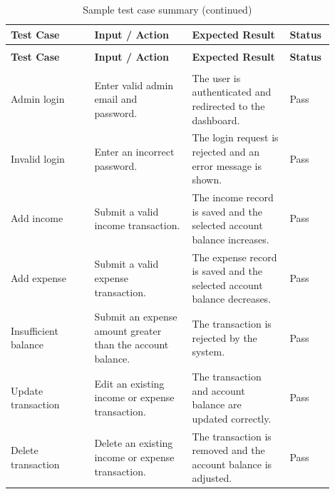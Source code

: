 \documentclass{article}
\begin{document}
\small
\renewcommand{\arraystretch}{1.2}

\begin{longtable}{
    >{\raggedright\arraybackslash}p{0.24\linewidth}
    J{0.28\linewidth}
    J{0.28\linewidth}
    >{\centering\arraybackslash}p{0.10\linewidth}
}
\caption{Sample test case summary}
\label{tab:test-cases} \\

\toprule
\textbf{Test Case} & \textbf{Input / Action} & \textbf{Expected Result} & \textbf{Status} \\
\midrule
\endfirsthead

\caption[]{Sample test case summary (continued)} \\

\toprule
\textbf{Test Case} & \textbf{Input / Action} & \textbf{Expected Result} & \textbf{Status} \\
\midrule
\endhead

\midrule
{} \\
\endfoot

\bottomrule
\endlastfoot

Admin login 
& Enter valid admin email and password. 
& The user is authenticated and redirected to the dashboard. 
& Pass \\

Invalid login 
& Enter an incorrect password. 
& The login request is rejected and an error message is shown. 
& Pass \\

Add income 
& Submit a valid income transaction. 
& The income record is saved and the selected account balance increases. 
& Pass \\

Add expense 
& Submit a valid expense transaction. 
& The expense record is saved and the selected account balance decreases. 
& Pass \\

Insufficient balance 
& Submit an expense amount greater than the account balance. 
& The transaction is rejected by the system. 
& Pass \\

Update transaction 
& Edit an existing income or expense transaction. 
& The transaction and account balance are updated correctly. 
& Pass \\

Delete transaction 
& Delete an existing income or expense transaction. 
& The transaction is removed and the account balance is adjusted. 
& Pass \\


\end{longtable}
\end{document}
